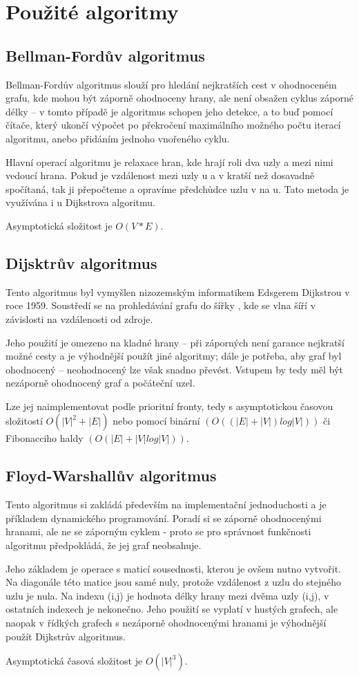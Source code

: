 \documentclass[a4paper,11pt]{article}
\begin{document}
\section{Použité algoritmy}
\subsection{Bellman-Fordův algoritmus}
Bellman-Fordův algoritmus slouží pro hledání nejkratších cest v ohodnoceném grafu, kde mohou být záporně ohodnoceny hrany, ale není obsažen cyklus záporné délky – v tomto případě je algoritmus schopen jeho detekce, a to buď pomocí čítače, který ukončí výpočet po překročení maximálního možného počtu iterací algoritmu, anebo přidáním jednoho vnořeného cyklu.
\par
Hlavní operací algoritmu je relaxace hran, kde hrají roli dva uzly a mezi nimi vedoucí hrana. Pokud je vzdálenost mezi uzly u a v kratší než dosavadně spočítaná, tak ji přepočteme a opravíme předchůdce uzlu v na u. Tato metoda je využívána i u Dijkstrova algoritmu.
\par
Asymptotická složitost je $O(V*E)$.

\subsection{Dijsktrův algoritmus}
Tento algoritmus byl vymyšlen nizozemským informatikem Edsgerem Dijkstrou v roce 1959. Soustředí se na prohledávání grafu do šířky , kde se vlna šíří v závislosti na vzdálenosti od zdroje.
\par
Jeho použití je omezeno na kladné hrany – při záporných není garance nejkratší možné cesty a je výhodnější použít jiné algoritmy; dále je potřeba, aby graf byl ohodnocený – neohodnocený lze však snadno převést. Vstupem by tedy měl být nezáporně ohodnocený graf a počáteční uzel.
\par
Lze jej naimplementovat podle prioritní fronty, tedy s asymptotickou časovou složitostí $O(|V|^2+|E|)$ nebo pomocí binární $(O((|E|+|V|)log|V|))$ či Fibonacciho haldy $(O(|E|+|V|log|V|))$.

\subsection{Floyd-Warshallův algoritmus}
Tento algoritmus si zakládá především na implementační jednoduchosti a je příkladem dynamického programování. Poradí si se záporně ohodnocenými hranami, ale ne se záporným cyklem - proto se pro správnost funkčnosti algoritmu předpokládá, že jej graf neobsahuje.
\par
Jeho základem je operace s maticí sousednosti, kterou je ovšem nutno vytvořit. Na diagonále této matice jsou samé nuly, protože vzdálenost z uzlu do stejného uzlu je nula. Na indexu (i,j) je hodnota délky hrany mezi dvěma uzly (i,j), v ostatních indexech je nekonečno. Jeho použití se vyplatí v hustých grafech, ale naopak v řídkých grafech s nezáporně ohodnocenými hranami je výhodnější použít Dijkstrův algoritmus.
\par
Asymptotická časová složitost je $O(|V|^3)$.
\end{document}
